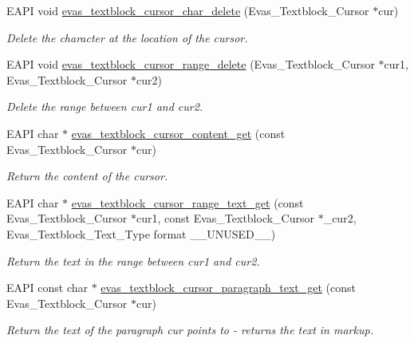 \begin{DoxyCompactItemize}
EAPI void \hyperlink{group__Evas__Object__Textblock_gaf9cd7ffa37008c0d6f61413703a0670e}{evas\_\-textblock\_\-cursor\_\-char\_\-delete} (Evas\_\-Textblock\_\-Cursor $\ast$cur)
\begin{DoxyCompactList}\small\item\em Delete the character at the location of the cursor. \item\end{DoxyCompactList}\item 
EAPI void \hyperlink{group__Evas__Object__Textblock_ga1b581bb089e3f335cde9f7e824e9e0d4}{evas\_\-textblock\_\-cursor\_\-range\_\-delete} (Evas\_\-Textblock\_\-Cursor $\ast$cur1, Evas\_\-Textblock\_\-Cursor $\ast$cur2)
\begin{DoxyCompactList}\small\item\em Delete the range between cur1 and cur2. \item\end{DoxyCompactList}\item 
EAPI char $\ast$ \hyperlink{group__Evas__Object__Textblock_ga77a5f2b742f74110aad4f0b2af6a91aa}{evas\_\-textblock\_\-cursor\_\-content\_\-get} (const Evas\_\-Textblock\_\-Cursor $\ast$cur)
\begin{DoxyCompactList}\small\item\em Return the content of the cursor. \item\end{DoxyCompactList}\item 
EAPI char $\ast$ \hyperlink{group__Evas__Object__Textblock_ga0ac2a1684a7def72b027d573f235c3c6}{evas\_\-textblock\_\-cursor\_\-range\_\-text\_\-get} (const Evas\_\-Textblock\_\-Cursor $\ast$cur1, const Evas\_\-Textblock\_\-Cursor $\ast$\_\-cur2, Evas\_\-Textblock\_\-Text\_\-Type format \_\-\_\-UNUSED\_\-\_\-)
\begin{DoxyCompactList}\small\item\em Return the text in the range between cur1 and cur2. \item\end{DoxyCompactList}\item 
EAPI const char $\ast$ \hyperlink{group__Evas__Object__Textblock_ga2369c2b14e0a58379e28327870a57f23}{evas\_\-textblock\_\-cursor\_\-paragraph\_\-text\_\-get} (const Evas\_\-Textblock\_\-Cursor $\ast$cur)
\begin{DoxyCompactList}\small\item\em Return the text of the paragraph cur points to -\/ returns the text in markup. \item\end{DoxyCompactList}\item 

\end{DoxyCompactItemize}
